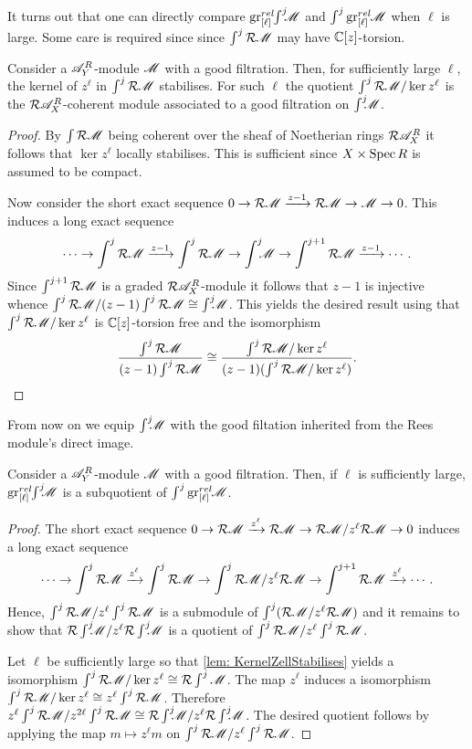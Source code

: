It turns out that one can directly compare $\operatorname{gr}_{[\ell]}^{rel}\mkern-5mu\int^j \mkern -8mu\mathscr{M}$ and $\int^j \operatorname{gr}_{[\ell]}^{rel}\mkern-5mu\mathscr{M}$ when $\ell$ is large. Some care is required since since $\int^j \mathcal{R} \mathscr{M}$ may have $\mathbb{C}[z]$-torsion.
\begin{lemma}\label{lem: KernelZellStabilises}
  Consider a $\mathscr{A}_Y^R$-module $\mathscr{M}$ with a good filtration. Then, for sufficiently large $\ell$, the kernel of $z^\ell$ in $\int^j \mathcal{R} \mathscr{M}$ stabilises. For such $\ell$ the quotient $\int^j \mathcal{R} \mathscr{M}/ \ker z^\ell$ is the $\mathcal{R} \mathscr{A}_X^R$-coherent module associated to a good filtration on $\int^j \mkern -8mu \mathscr{M}$.
\end{lemma}
\begin{proof}
  By $\int \mathcal{R} \mathscr{M}$ being coherent over the sheaf of Noetherian rings $\mathcal{R}\mathscr{A}_X^R$ it follows that $\ker z^\ell$ locally stabilises. This is sufficient since $X\times \operatorname{Spec} R$ is assumed to be compact.

    Now consider the short exact sequence $0\to \mathcal{R} \mathscr{M} \xrightarrow{z-1} \mathcal{R} \mathscr{M} \to \mathscr{M} \to 0$. This induces a long exact sequence
    $$\cdots \to \int^j \mathcal{R} \mathscr{M} \xrightarrow{z-1} \int^j \mathcal{R} \mathscr{M} \to \int^j \mkern -8mu \mathscr{M} \to \int^{j+1} \mathcal{R} \mathscr{M} \xrightarrow{z-1}\cdots. $$
    Since $\int^{j+1} \mathcal{R} \mathscr{M}$ is a graded $\mathcal{R}\mathscr{A}_X^R$-module it follows that $z-1$ is injective whence $\int^j \mathcal{R} \mathscr{M} / (z-1)\int^j \mathcal{R} \mathscr{M} \cong \int^j \mkern -8mu \mathscr{M}$. This yields the desired result using that $\int^j \mathcal{R} \mathscr{M} / \ker z^\ell$ is $\mathbb{C}[z]$-torsion free and the isomorphism
    $$ \frac{\int^j \mathcal{R} \mathscr{M} }{(z-1)\int^j \mathcal{R} \mathscr{M} } \cong \frac{\int^j \mathcal{R} \mathscr{M} /\ker z^\ell }{(z-1)(\int^j \mathcal{R} \mathscr{M}/\ker z^\ell) }.$$
\end{proof}
From now on we equip $\int^j \mkern -8mu \mathscr{M}$ with the good filtation inherited from the Rees module's direct image.
\begin{lemma}\label{lem: EllLargeSubquotent}
    Consider a $\mathscr{A}_Y^R$-module $\mathscr{M}$ with a good filtration. Then, if $\ell$ is sufficiently large, $\operatorname{gr}_{[\ell]}^{rel}\mkern-5mu \int^j \mkern -8mu\mathscr{M}$ is a subquotient of $\int^j\operatorname{gr}_{[\ell]}^{rel}\mkern-5mu\mathscr{M}$.
\end{lemma}
\begin{proof}
  The short exact sequence $0\to \mathcal{R}\mathscr{M} \xrightarrow{z^\ell}\mathcal{R} \mathscr{M} \to \mathcal{R}\mathscr{M} / z^\ell \mathcal{R}\mathscr{M} \to 0$ induces a long exact sequence
  $$\cdots \to \int^j \mathcal{R} \mathscr{M} \xrightarrow{z^\ell} \int^j \mathcal{R} \mathscr{M} \to \int^j \mathcal{R}\mathscr{M}/z^\ell \mathcal{R}\mathscr{M} \to \int^{j+1} \mathcal{R} \mathscr{M} \xrightarrow{z^\ell}\cdots. $$
  Hence, $\int^j \mathcal{R} \mathscr{M} / z^\ell \int^j \mathcal{R} \mathscr{M}$ is a submodule of $\int^j (\mathcal{R}\mathscr{M}/z^\ell \mathcal{R}\mathscr{M})$ and it remains to show that $\mathcal{R} \int^j \mkern -8mu \mathscr{M}/ z^\ell \mathcal{R} \int^j \mkern -8mu \mathscr{M}$ is a quotient of $\int^j \mathcal{R} \mathscr{M} / z^\ell \int^j \mathcal{R} \mathscr{M}$.

  Let $\ell$ be sufficiently large so that \cref{lem: KernelZellStabilises} yields a isomorphism $\int^j \mathcal{R} \mathscr{M} / \ker z^\ell \cong \mathcal{R}\int^j \mathscr{M}$. The map $z^\ell$ induces a isomorphism $\int^j \mathcal{R} \mathscr{M} / \ker z^\ell \cong z^\ell \int^j \mathcal{R} \mathscr{M}$. Therefore $z^\ell \int^j \mathcal{R} \mathscr{M} / z^{2\ell}\int^j \mathcal{R}\mathscr{M} \cong \mathcal{R} \int^j \mkern -8mu \mathscr{M} / z^\ell \mathcal{R}\int^j \mkern -8mu \mathscr{M} $.
  The desired quotient follows by applying the map $m\mapsto z^\ell m$ on $\int^j \mathcal{R} \mathscr{M} / z^\ell \int^j \mathcal{R} \mathscr{M}$.
\end{proof}
